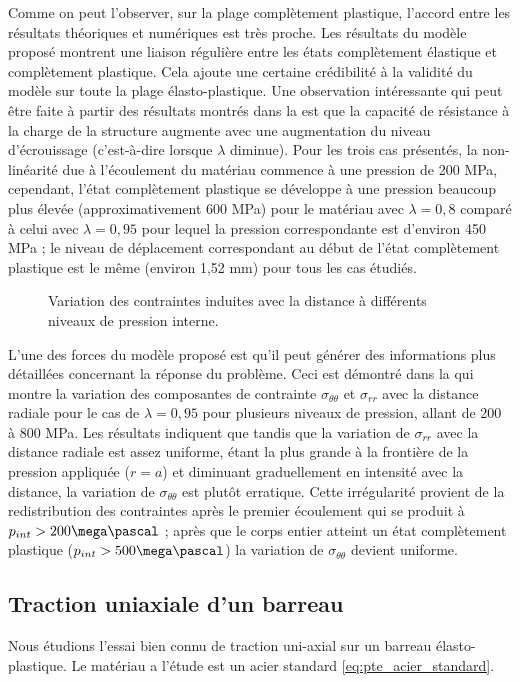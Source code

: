 \documentclass[10pt]{book}
\def\path{./fig}
\begin{document}
Comme on peut l'observer, sur la plage complètement plastique, l'accord entre les résultats théoriques et numériques est très proche. Les résultats du modèle proposé montrent une liaison régulière entre les états complètement élastique et complètement plastique. Cela ajoute une certaine crédibilité à la validité du modèle sur toute la plage élasto-plastique. Une observation intéressante qui peut être faite à partir des résultats montrés dans la  est que la capacité de résistance à la charge de la structure augmente avec une augmentation du niveau d'écrouissage (c'est-à-dire lorsque $\lambda$ diminue). Pour les trois cas présentés, la non-linéarité due à l'écoulement du matériau commence à une pression de 200 MPa, cependant, l'état complètement plastique se développe à une pression beaucoup plus élevée (approximativement 600 MPa) pour le matériau avec $\lambda = 0,8$ comparé à celui avec $\lambda = 0,95$ pour lequel la pression correspondante est d'environ 450 MPa ; le niveau de déplacement correspondant au début de l'état complètement plastique est le même (environ 1,52 mm) pour tous les cas étudiés.

\begin{figure}[h!]
\caption{Variation des contraintes induites avec la distance à différents niveaux de pression interne.}
\label{fig:repartition_sigma_1_3}
\end{figure}
L'une des forces du modèle proposé est qu'il peut générer des informations plus détaillées concernant la réponse du problème. Ceci est démontré dans la  qui montre la variation des composantes de contrainte $\sigma_{\theta\theta}$ et $\sigma_{rr}$ avec la distance radiale pour le cas de $\lambda = 0,95$ pour plusieurs niveaux de pression, allant de 200 à 800 MPa. Les résultats indiquent que tandis que la variation de $\sigma_{rr}$ avec la distance radiale est assez uniforme, étant la plus grande à la frontière de la pression appliquée ($r = a$) et diminuant graduellement en intensité avec la distance, la variation de $\sigma_{\theta\theta}$ est plutôt erratique. Cette irrégularité provient de la redistribution des contraintes après le premier écoulement qui se produit à $p_{int} > 200\mega\pascal$ ; après que le corps entier atteint un état complètement plastique ($p_{int} > 500\mega\pascal$) la variation de $\sigma_{\theta\theta}$ devient uniforme.
\subsection{Traction uniaxiale d'un barreau}
Nous étudions l'essai bien connu de traction uni-axial sur un barreau élasto-plastique. Le matériau a l'étude est un acier standard \eqref{eq:pte_acier_standard}.
\end{document}
